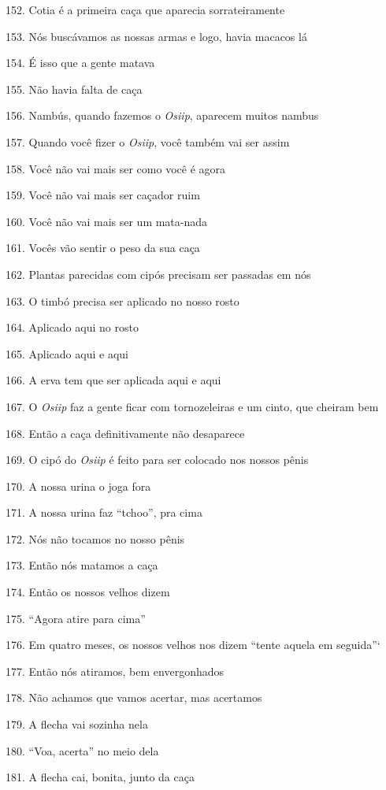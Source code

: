 152. Cotia é a primeira caça que aparecia sorrateiramente

153. Nós buscávamos as nossas armas e logo, havia macacos lá

154. É isso que a gente matava

155. Não havia falta de caça

156. Nambús, quando fazemos o \emph{Osiip}, aparecem muitos nambus

157. Quando você fizer o \emph{Osiip}, você também vai ser assim

158. Você não vai mais ser como você é agora

159. Você não vai mais ser caçador ruim

160. Você não vai mais ser um mata-nada

161. Vocês vão sentir o peso da sua caça

162. Plantas parecidas com cipós precisam ser passadas em nós

163. O timbó precisa ser aplicado no nosso rosto

164. Aplicado aqui no rosto

165. Aplicado aqui e aqui

166. A erva tem que ser aplicada aqui e aqui

167. O \emph{Osiip} faz a gente ficar com tornozeleiras e um cinto, que
cheiram bem

168. Então a caça definitivamente não desaparece

169. O cipó do \emph{Osiip} é feito para ser colocado nos nossos pênis

170. A nossa urina o joga fora

171. A nossa urina faz ``tchoo'', pra cima

172. Nós não tocamos no nosso pênis

173. Então nós matamos a caça

174. Então os nossos velhos dizem

175. ``Agora atire para cima''

176. Em quatro meses, os nossos velhos nos dizem ``tente aquela em
seguida''`

177. Então nós atiramos, bem envergonhados

178. Não achamos que vamos acertar, mas acertamos

179. A flecha vai sozinha nela

180. ``Voa, acerta'' no meio dela

181. A flecha cai, bonita, junto da caça


